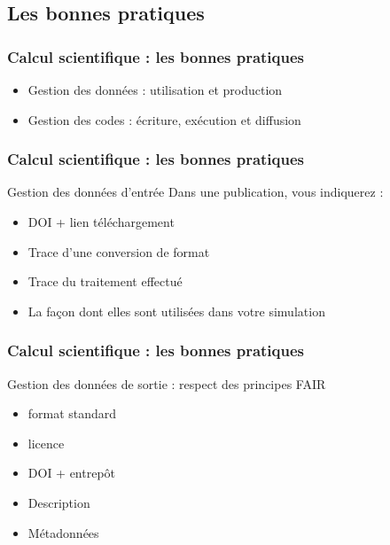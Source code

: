 \subsection{Les bonnes pratiques}

\begin{frame}
  \frametitle{Calcul scientifique : les bonnes pratiques}
  
\begin{itemize}
\item Gestion des données : utilisation et production 
  \item Gestion des codes : écriture, exécution et diffusion 
  \end{itemize}
\vspace{0.4cm}
\center
{}
\end{frame}

\begin{frame}
  \frametitle{Calcul scientifique : les bonnes pratiques}

  \begin{block}{Gestion des données d'entrée }
Dans une publication, vous indiquerez : 
  \begin{itemize}
  \item DOI + lien téléchargement
  \item Trace d'une conversion de format 
  \item Trace du traitement effectué
  \item La façon dont elles sont utilisées dans votre simulation 
  \end{itemize}
\end{block}

\end{frame}

\begin{frame}
  \frametitle{Calcul scientifique : les bonnes pratiques}

\begin{block}{Gestion des données de sortie : respect des principes FAIR }
  \begin{itemize}
  \item format standard
  \item licence
  \item DOI + entrepôt
  \item Description 
  \item Métadonnées 
\end{itemize}
\end{block}  
\end{frame}


